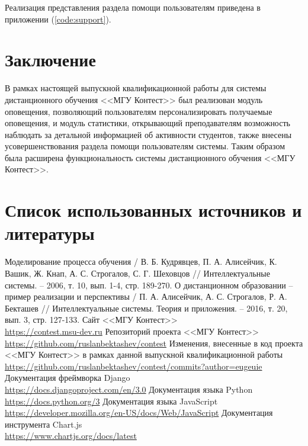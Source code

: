 \documentclass[14pt, a4paper, oneside]{extarticle}
\begin{document}
Реализация представления раздела помощи пользователям приведена в приложении (\ref{code:support}).
\newpage

\section{Заключение}
В рамках настоящей выпускной квалификационной работы для системы дистанционного обучения <<МГУ Контест>> был реализован модуль оповещения, позволяющий пользователям персонализировать получаемые оповещения, и модуль статистики, открывающий преподавателям возможность наблюдать за детальной информацией об активности студентов, также внесены усовершенствования раздела помощи пользователям системы. Таким образом была расширена функциональность системы дистанционного обучения <<МГУ Контест>>.
\newpage

\section{Список использованных источников и литературы}
\begingroup
\renewcommand{\section}[2]{}
\begin{thebibliography}{20}
    Моделирование процесса обучения / В. Б. Кудрявцев, П. А. Алисейчик, К. Вашик, Ж. Кнап, А. С. Строгалов, С. Г. Шеховцов // Интеллектуальные системы. – 2006, т. 10, вып. 1-4, стр. 189-270.
    О дистанционном образовании – пример реализации и перспективы / П. А. Алисейчик, А. С. Строгалов, Р. А. Бекташев // Интеллектуальные системы. Теория и приложения. – 2016, т. 20, вып. 3, стр. 127-133.
    Сайт <<МГУ Контест>>\\
    \url{https://contest.msu-dev.ru}
    Репозиторий проекта <<МГУ Контест>>\\
    \url{https://github.com/ruslanbektashev/contest}
    Изменения, внесенные в код проекта <<МГУ Контест>> в рамках данной выпускной квалификационной работы\\
    \url{https://github.com/ruslanbektashev/contest/commits?author=eugeuie}
    Документация фреймворка Django\\
    \url{https://docs.djangoproject.com/en/3.0}
    Документация языка Python\\
    \url{https://docs.python.org/3}
    Документация языка JavaScript\\
    \url{https://developer.mozilla.org/en-US/docs/Web/JavaScript}
    Документация инструмента Chart.js\\
    \url{https://www.chartjs.org/docs/latest}
\end{thebibliography}
\endgroup
\newpage
\end{document}
